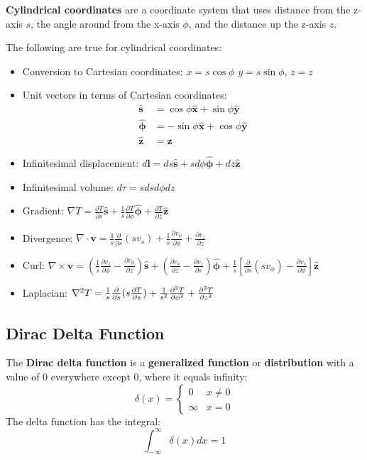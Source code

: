 \documentclass{article}
\begin{document}
\begin{definition}
    \textbf{Cylindrical coordinates} are a coordinate system that uses distance from the z-axis \(s\), the angle around from the x-axis \(\phi\), and the distance up the z-axis \(z\).
\end{definition}

The following are true for cylindrical coordinates:
\begin{itemize}
    \item Conversion to Cartesian coordinates: \(x=s\cos \phi \) \(y=s\sin \phi \), \(z=z\) 
    \item Unit vectors in terms of Cartesian coordinates:
        \begin{align*}
            \mathbf{\hat{s}}&=\cos \phi \mathbf{\hat{x}} +\sin \phi \mathbf{\hat{y}} \\
            \mathbf{\hat{\phi}}&=-\sin \phi \mathbf{\hat{x}} +\cos \phi \mathbf{\hat{y}} \\
            \mathbf{\hat{z}} &=\mathbf{\hat{z}} 
        \end{align*}
    \item Infinitesimal displacement: \(d \mathbf{l}=ds \mathbf{\hat{s}} +s d \phi \mathbf{\hat{\phi}} +dz \mathbf{\hat{z}} \)
    \item Infinitesimal volume: \(d \tau =s ds d \phi dz\)
    \item Gradient: \(\nabla T=\frac{\partial T}{\partial s}\mathbf{\hat{s}} +\frac{1}{s}\frac{\partial T}{\partial \phi }\mathbf{\hat{\phi}} +\frac{\partial T}{\partial z}\mathbf{\hat{z}} \)
    \item Divergence: \(\nabla \cdot \mathbf{v} =\frac{1}{s}\frac{\partial}{\partial s}(sv_s)+\frac{1}{s}\frac{\partial v_{\phi }}{\partial \phi }+\frac{\partial v_z}{\partial z}\)
    \item Curl: \(\nabla \times \mathbf{v} =(\frac{1}{s}\frac{\partial v_z}{\partial \phi }-\frac{\partial v_{\phi }}{\partial z})\mathbf{\hat{s}} +(\frac{\partial v_s}{\partial z}-\frac{\partial v_z}{\partial s})\mathbf{\hat{\phi}} +\frac{1}{s}[\frac{\partial}{\partial s}(sv_{\phi })-\frac{\partial v_s}{\partial \phi }]\mathbf{\hat{z}} \)
    \item Laplacian: \(\laplacian{T}=\frac{1}{s}\frac{\partial }{\partial s}(s\frac{\partial T}{\partial s})+\frac{1}{s^2}\frac{\partial^2 T}{\partial \phi^2}+\frac{\partial^2 T}{\partial z^2}\)     
\end{itemize}

\subsection{Dirac Delta Function}
\begin{definition}
    The \textbf{Dirac delta function} is a \textbf{generalized function} or \textbf{distribution} with a value of 0 
    everywhere except 0, where it equals infinity:
    \[
        \delta(x)=\begin{cases} 0 & x\neq 0 \\ \infty & x=0 \end{cases}
    \]
    The delta function has the integral:
    \[
        \int_{-\infty }^{\infty }\delta (x)dx=1
    \]
\end{definition}
\end{document}

